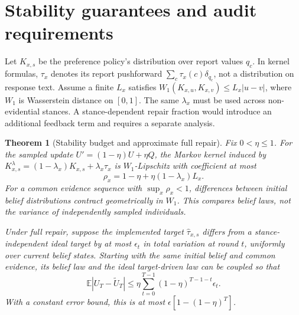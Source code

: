 \documentclass[10pt]{article}
\newtheorem{theorem}{Theorem}
\newcommand{\E}{\mathbb E}
\begin{document}
\section{Stability guarantees and audit requirements}
Let $K_{x,s}$ be the preference policy's distribution over report values $q_c$. In kernel formulas, $\tau_x$ denotes its report pushforward $\sum_c\tau_x(c)\delta_{q_c}$, not a distribution on response text.
Assume a finite $L_x$ satisfies
$W_1(K_{x,u},K_{x,v})\le L_x|u-v|$, where $W_1$ is Wasserstein distance on
$[0,1]$. The same $\lambda_x$ must be used across non-evidential stances.
A stance-dependent repair fraction would introduce an additional feedback
term and requires a separate analysis.

\begin{theorem}[Stability budget and approximate full repair]
\label{thm:stability}
Fix $0<\eta\le1$. For the sampled update $U'=(1-\eta)U+\eta Q$,
the Markov kernel induced by
$K^\lambda_{x,s}=(1-\lambda_x)K_{x,s}+\lambda_x\tau_x$ is $W_1$-Lipschitz
with coefficient at most
\begin{equation}
 \rho_x=1-\eta+\eta(1-\lambda_x)L_x.
 \label{eq:rho}
\end{equation}
For a common evidence sequence with $\sup_x\rho_x<1$, differences between
initial belief distributions contract geometrically in $W_1$. This compares
belief laws, not the variance of independently sampled individuals.

Under full repair, suppose the implemented target $\widehat\tau_{x,s}$ differs
from a stance-independent ideal target by at most $\epsilon_t$ in total
variation at round $t$, uniformly over current belief states. Starting with the same initial belief and common
evidence, its belief law and the ideal target-driven law can be coupled so that
\begin{equation}
 \E|U_T-\widetilde U_T|
 \le\eta\sum_{t=0}^{T-1}(1-\eta)^{T-1-t}\epsilon_t.
 \label{eq:error}
\end{equation}
With a constant error bound, this is at most
$\epsilon[1-(1-\eta)^T]$.

\end{theorem}
\end{document}
